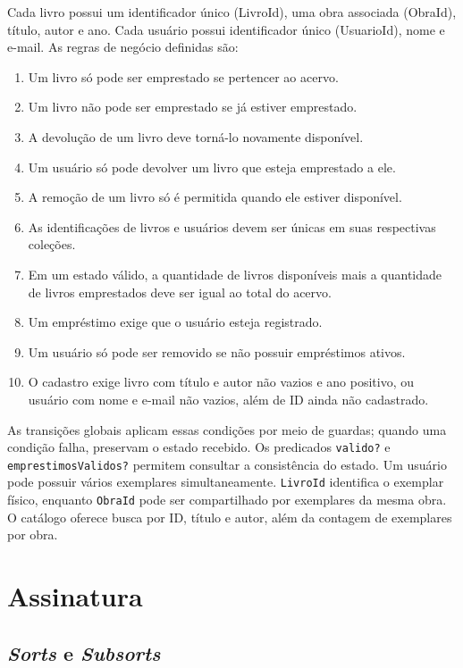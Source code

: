 \documentclass[a4paper,12pt]{article}
\begin{document}
Cada livro possui um identificador único (LivroId), uma obra associada (ObraId),
título, autor e ano. Cada usuário possui identificador único (UsuarioId), nome e
e-mail. As regras de negócio definidas são:

\begin{enumerate}
    \item Um livro só pode ser emprestado se pertencer ao acervo.
    \item Um livro não pode ser emprestado se já estiver emprestado.
    \item A devolução de um livro deve torná-lo novamente disponível.
    \item Um usuário só pode devolver um livro que esteja emprestado a ele.
    \item A remoção de um livro só é permitida quando ele estiver disponível.
    \item As identificações de livros e usuários devem ser únicas em suas
          respectivas coleções.
    \item Em um estado válido, a quantidade de livros disponíveis mais a
          quantidade de livros emprestados deve ser igual ao total do acervo.
    \item Um empréstimo exige que o usuário esteja registrado.
    \item Um usuário só pode ser removido se não possuir empréstimos ativos.
    \item O cadastro exige livro com título e autor não vazios e ano positivo,
          ou usuário com nome e e-mail não vazios, além de ID ainda não cadastrado.
\end{enumerate}

As transições globais aplicam essas condições por meio de guardas; quando uma
condição falha, preservam o estado recebido. Os predicados \texttt{valido?} e
\texttt{emprestimosValidos?} permitem consultar a consistência do estado.
Um usuário pode possuir vários exemplares simultaneamente. \texttt{LivroId}
identifica o exemplar físico, enquanto \texttt{ObraId} pode ser compartilhado por
exemplares da mesma obra. O catálogo oferece busca por ID, título e autor, além
da contagem de exemplares por obra.

\section{Assinatura}

\subsection{\textit{Sorts} e \textit{Subsorts}}
\end{document}
